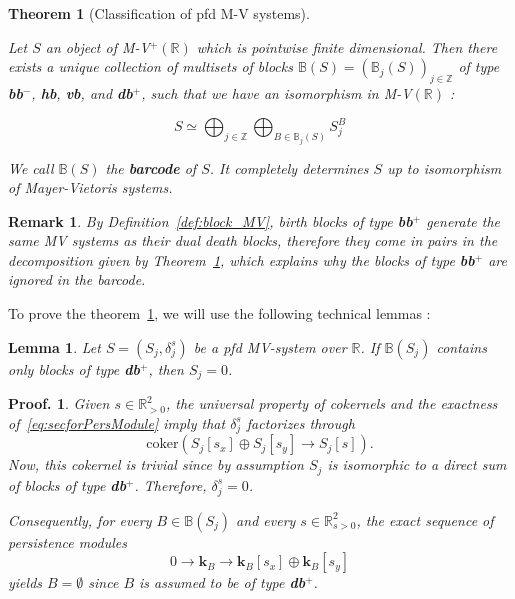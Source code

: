 \documentclass[a4paper, english, 11pt]{article}
\newcommand{\kk}[0]{\textbf{k}}
\newcommand{\0}{\vec{0}}
\newcommand{\R}[0]{\mathbb{R}}
\newcommand{\Z}[0]{\mathbb{Z}}
\newtheorem*{pf}{Proof.} }
\newtheorem{remark}[prop]{Remark}
\newtheorem{lem}[prop]{Lemma}
\newtheorem{thm}[prop]{Theorem}
\begin{document}
\begin{thm}[Classification of pfd M-V systems]\label{thm:decom_MV}

Let $S$ an object of M-V$^+ (\R)$ which is pointwise finite dimensional.  Then there exists a unique collection of multisets of blocks $\mathbb{B}(S) = (\mathbb{B}_j(S))_{j\in \Z}$ of type \textbf{bb$^-$}, \textbf{hb}, \textbf{vb}, and \textbf{db}$^+$, such that we have an isomorphism in M-V$(\R)$ : 

$$S \simeq \bigoplus_{j\in \Z} \bigoplus_{B\in \mathbb{B}_j(S)} S_j^B $$

We call $\mathbb{B}(S)$ the \textbf{barcode} of $S$. It completely determines $S$ up to isomorphism of Mayer-Vietoris systems.
\end{thm}

\begin{remark}
By Definition~\ref{def:block_MV}, birth blocks of type \textbf{bb$^+$} generate the same MV systems as their dual death blocks, therefore  they come in pairs in the decomposition given by Theorem~\ref{thm:decom_MV}, which explains why the blocks of type \textbf{bb$^+$} are ignored in the barcode.
\end{remark}


To prove the theorem~\ref{thm:decom_MV}, we will use the following technical lemmas :

\begin{lem}\label{lem:dbnull}
Let $S = (S_j,\delta_j^s)$ be a pfd MV-system over $\R$. If $\mathbb{B}(S_j)$ contains only blocks of type \textbf{db}$^+$,
then $S_j=0$.

\end{lem}

\begin{pf}
Given $s\in \R^2_{>0}$, 
the universal property of cokernels and the exactness of~\eqref{eq:secforPersModule} imply that $\delta^s_j$ factorizes through $$\text{coker}\left (S_j[s_x] \oplus S_j[s_y] \longrightarrow S_j[s] \right ).$$
Now, this cokernel is trivial 
since by assumption $S_j$ is isomorphic to a direct sum of blocks of type \textbf{db}$^+$. Therefore, $\delta^s_j = 0$.

Consequently, for every $B\in \mathbb{B}(S_j)$ and every $s\in \R^2_{s>0}$, the exact sequence of persistence modules 
$$0 \longrightarrow \kk_B \longrightarrow \kk_B[s_x] \oplus \kk_B[s_y] $$
yields $B = \emptyset$ since $B$ is assumed to be of type \textbf{db}$^+$.
\end{pf}
\end{document}
